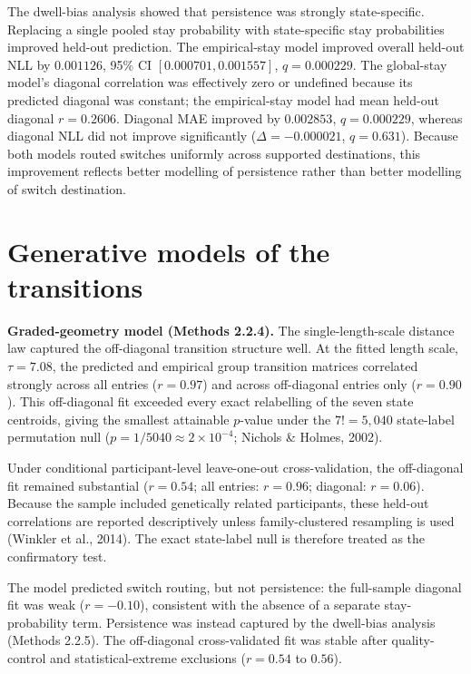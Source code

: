 \documentclass[12pt,a4paper]{report}
\begin{document}
The dwell-bias analysis showed that persistence was strongly state-specific. Replacing a single pooled stay probability with state-specific stay probabilities improved held-out prediction. The empirical-stay model improved overall held-out NLL by $0.001126$, 95\% CI $[0.000701,0.001557]$, $q=0.000229$. The global-stay model's diagonal correlation was effectively zero or undefined because its predicted diagonal was constant; the empirical-stay model had mean held-out diagonal $r=0.2606$. Diagonal MAE improved by $0.002853$, $q=0.000229$, whereas diagonal NLL did not improve significantly ($\Delta=-0.000021$, $q=0.631$). Because both models routed switches uniformly across supported destinations, this improvement reflects better modelling of persistence rather than better modelling of switch destination.

\section{Generative models of the transitions}

\textbf{Graded-geometry model (Methods 2.2.4).}
The single-length-scale distance law captured the off-diagonal transition structure well. At the fitted length scale, $\tau = 7.08$, the predicted and empirical group transition matrices correlated strongly across all entries ($r = 0.97$) and across off-diagonal entries only ($r = 0.90$). This off-diagonal fit exceeded every exact relabelling of the seven state centroids, giving the smallest attainable $p$-value under the $7! = 5{,}040$ state-label permutation null ($p = 1/5040 \approx 2 \times 10^{-4}$; Nichols \& Holmes, 2002).

Under conditional participant-level leave-one-out cross-validation, the off-diagonal fit remained substantial ($r = 0.54$; all entries: $r = 0.96$; diagonal: $r = 0.06$). Because the sample included genetically related participants, these held-out correlations are reported descriptively unless family-clustered resampling is used (Winkler et al., 2014). The exact state-label null is therefore treated as the confirmatory test.

The model predicted switch routing, but not persistence: the full-sample diagonal fit was weak ($r = -0.10$), consistent with the absence of a separate stay-probability term. Persistence was instead captured by the dwell-bias analysis (Methods 2.2.5). The off-diagonal cross-validated fit was stable after quality-control and statistical-extreme exclusions ($r = 0.54$ to $0.56$).
\end{document}
